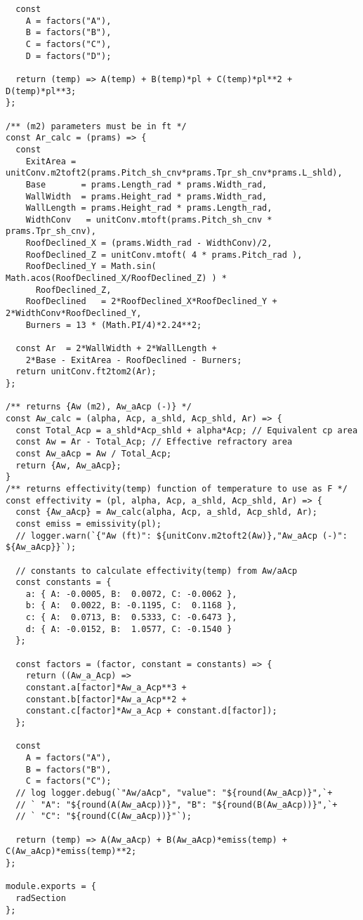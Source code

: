 \begin{verbatim}
  const 
    A = factors("A"),
    B = factors("B"),
    C = factors("C"),
    D = factors("D");

  return (temp) => A(temp) + B(temp)*pl + C(temp)*pl**2 + D(temp)*pl**3;
};

/** (m2) parameters must be in ft */
const Ar_calc = (prams) => {
  const
    ExitArea = unitConv.m2toft2(prams.Pitch_sh_cnv*prams.Tpr_sh_cnv*prams.L_shld),
    Base       = prams.Length_rad * prams.Width_rad,
    WallWidth  = prams.Height_rad * prams.Width_rad,
    WallLength = prams.Height_rad * prams.Length_rad,
    WidthConv   = unitConv.mtoft(prams.Pitch_sh_cnv * prams.Tpr_sh_cnv),
    RoofDeclined_X = (prams.Width_rad - WidthConv)/2,
    RoofDeclined_Z = unitConv.mtoft( 4 * prams.Pitch_rad ),
    RoofDeclined_Y = Math.sin( Math.acos(RoofDeclined_X/RoofDeclined_Z) ) *
      RoofDeclined_Z,
    RoofDeclined   = 2*RoofDeclined_X*RoofDeclined_Y + 2*WidthConv*RoofDeclined_Y,
    Burners = 13 * (Math.PI/4)*2.24**2;
    
  const Ar  = 2*WallWidth + 2*WallLength + 
    2*Base - ExitArea - RoofDeclined - Burners;
  return unitConv.ft2tom2(Ar);
};

/** returns {Aw (m2), Aw_aAcp (-)} */
const Aw_calc = (alpha, Acp, a_shld, Acp_shld, Ar) => {
  const Total_Acp = a_shld*Acp_shld + alpha*Acp; // Equivalent cp area
  const Aw = Ar - Total_Acp; // Effective refractory area
  const Aw_aAcp = Aw / Total_Acp;
  return {Aw, Aw_aAcp};
}
/** returns effectivity(temp) function of temperature to use as F */
const effectivity = (pl, alpha, Acp, a_shld, Acp_shld, Ar) => {
  const {Aw_aAcp} = Aw_calc(alpha, Acp, a_shld, Acp_shld, Ar);
  const emiss = emissivity(pl);
  // logger.warn(`{"Aw (ft)": ${unitConv.m2toft2(Aw)},"Aw_aAcp (-)": ${Aw_aAcp}}`);

  // constants to calculate effectivity(temp) from Aw/aAcp
  const constants = {
    a: { A: -0.0005, B:  0.0072, C: -0.0062 },
    b: { A:  0.0022, B: -0.1195, C:  0.1168 },
    c: { A:  0.0713, B:  0.5333, C: -0.6473 },
    d: { A: -0.0152, B:  1.0577, C: -0.1540 }
  };

  const factors = (factor, constant = constants) => {
    return ((Aw_a_Acp) => 
    constant.a[factor]*Aw_a_Acp**3 + 
    constant.b[factor]*Aw_a_Acp**2 + 
    constant.c[factor]*Aw_a_Acp + constant.d[factor]);
  };

  const 
    A = factors("A"),
    B = factors("B"),
    C = factors("C");
  // log logger.debug(`"Aw/aAcp", "value": "${round(Aw_aAcp)}",`+
  // ` "A": "${round(A(Aw_aAcp))}", "B": "${round(B(Aw_aAcp))}",`+
  // ` "C": "${round(C(Aw_aAcp))}"`);

  return (temp) => A(Aw_aAcp) + B(Aw_aAcp)*emiss(temp) + C(Aw_aAcp)*emiss(temp)**2;
};

module.exports = {
  radSection
};
\end{verbatim}

